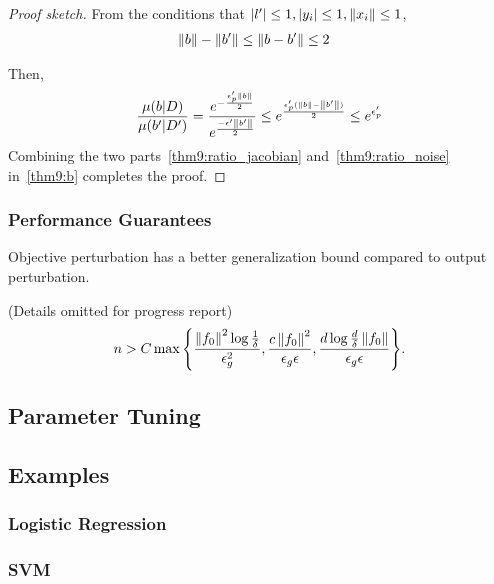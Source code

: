 \documentclass{article} %
\begin{document}
\begin{proof}[Proof sketch]
From the conditions that $\left\lvert l'\right\rvert \le 1, \left\lvert y_i\right\rvert \le 1, \left\lVert x_i\right\rVert \le 1$,
\begin{align*}
& \left\lVert b\right\rVert - \left\lVert b'\right\rVert \le \left\lVert b - b'\right\rVert \le 2
\end{align*}

Then, \begin{align}
 \frac{\mu(b | D)}{\mu(b' | D')} = \frac{e^{-\frac{\epsilon_p' \left\lVert b\right\rVert}{2}}}{e^{\frac{-\epsilon' \left\lVert b'\right\rVert}{2}}}\le e^{\frac{\epsilon_p'(\left\lVert b\right\rVert - \left\lVert b'\right\rVert)}{2}} \le e^{\epsilon'_p} \label{thm9:ratio_noise}
\end{align}
 Combining the two parts~\eqref{thm9:ratio_jacobian} and~\eqref{thm9:ratio_noise} in~\eqref{thm9:b} completes the proof.
\end{proof}

\subsubsection{Performance Guarantees}
Objective perturbation has a better generalization bound compared to output perturbation.
\begin{theorem} (Details omitted for progress report)
$$n > C\max{\left\{ \frac{\left\lVert f_0\right\rVert^2 \log{\frac{1}{\delta}}}{\epsilon_g^2}, \frac{c\left\lVert f_0\right\rVert^2}{\epsilon_g \epsilon}, \frac{d\log{\frac{d}{\delta}} \left\lVert f_0\right\rVert}{\epsilon_g\epsilon}\right\}}.$$
\end{theorem}
\subsection{Parameter Tuning}
\subsection{Examples}
	\subsubsection{Logistic Regression}
	\subsubsection{SVM}

{\small


}
\end{document}
